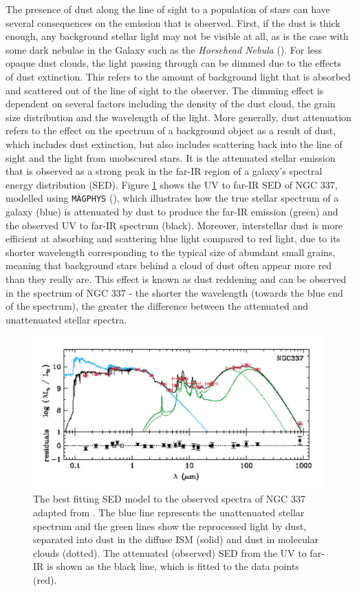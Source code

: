 The presence of dust along the line of sight to a population of stars can have several consequences on the emission that is observed. First, if the dust is thick enough, any background stellar light may not be visible at all, as is the case with some dark nebulae in the Galaxy such as the \textit{Horsehead Nebula} (\citealt{Greenberg_2002}). For less opaque dust clouds, the light passing through can be dimmed due to the effects of dust extinction. This refers to the amount of background light that is absorbed and scattered out of the line of sight to the observer. The dimming effect is dependent on several factors including the density of the dust cloud, the grain size distribution and the wavelength of the light. More generally, dust attenuation refers to the effect on the spectrum of a background object as a result of dust, which includes dust extinction, but also includes scattering back into the line of sight and the light from unobscured stars. It is the attenuated stellar emission that is observed as a strong peak in the far-IR region of a galaxy's spectral energy distribution (SED). Figure \ref{fig:unattenuated_attenuated_sed} shows the UV to far-IR SED of NGC 337, modelled using \texttt{MAGPHYS} (\citealt{daCunha_2008}), which illustrates how the true stellar spectrum of a galaxy (blue) is attenuated by dust to produce the far-IR emission (green) and the observed UV to far-IR spectrum (black). Moreover, interstellar dust is more efficient at absorbing and scattering blue light compared to red light, due to its shorter wavelength corresponding to the typical size of abundant small grains, meaning that background stars behind a cloud of dust often appear more red than they really are. This effect is known as dust reddening and can be observed in the spectrum of NGC 337 - the shorter the wavelength (towards the blue end of the spectrum), the greater the difference between the attenuated and unattenuated stellar spectra.

\begin{figure}
    \centering
	\includegraphics[width=0.9\columnwidth]{Figures/unattenuated_attenuated_sed.pdf}
	\caption[SED of NGC 337]{The best fitting SED model to the observed spectra of NGC 337 adapted from \citealt{daCunha_2008}. The blue line represents the unattenuated stellar spectrum and the green lines show the reprocessed light by dust, separated into dust in the diffuse ISM (solid) and dust in molecular clouds (dotted). The attenuated (observed) SED from the UV to far-IR is shown as the black line, which is fitted to the data points (red).}
	\label{fig:unattenuated_attenuated_sed}
\end{figure}

